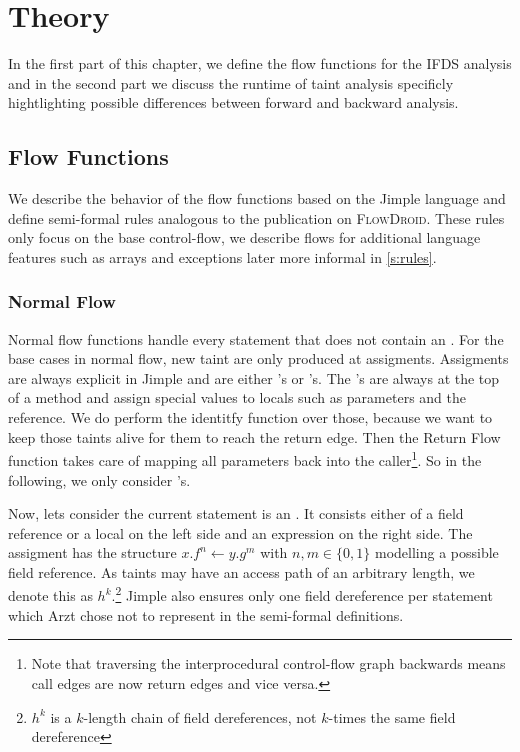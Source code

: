 \documentclass[../draft.tex]{subfiles}
\begin{document}
    \chapter{Theory}
    In the first part of this chapter, we define the flow functions for the IFDS analysis and in the second part we discuss the runtime of taint analysis specificly hightlighting possible differences between forward and backward analysis.

    \section{Flow Functions}\label{s:flowfunctions}
    We describe the behavior of the flow functions based on the Jimple language and define semi-formal rules analogous to the publication\cite{Arzt2017PhD} on \textsc{FlowDroid}. These rules only focus on the base control-flow, we describe flows for additional language features such as arrays and exceptions later more informal in \autoref{s:rules}.

    \subsection{Normal Flow}\label{s:normalflow}
    Normal flow functions handle every statement that does not contain an .
    For the base cases in normal flow, new taint are only produced at assigments. Assigments are always explicit in Jimple and are either 's or 's. The 's are always at the top of a method and assign special values to locals such as parameters and the  reference. We do perform the identitfy function over those, because we want to keep those taints alive for them to reach the return edge. Then the Return Flow function takes care of mapping all parameters back into the caller\footnote{Note that traversing the interprocedural control-flow graph backwards means call edges are now return edges and vice versa.}. So in the following, we only consider 's.

    Now, lets consider the current statement is an . It consists either of a field reference or a local on the left side and an expression on the right side. The assigment has the structure $x.f^n \leftarrow y.g^m$ with $n,m \in \{0,1\}$ modelling a possible field reference. As taints may have an access path of an arbitrary length, we denote this as $h^k$.\footnote{$h^k$ is a $k$-length chain of field dereferences, not $k$-times the same field dereference} Jimple also ensures only one field dereference per statement which Arzt chose not to represent in the semi-formal definitions. 
\end{document}
